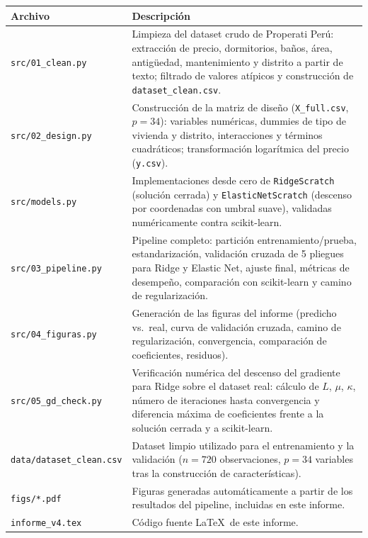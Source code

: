 \documentclass[11pt,a4paper]{article}
\theoremstyle{simple}
\begin{document}
\begin{center}
\renewcommand{\arraystretch}{1.2}
\begin{tabular}{L{5.2cm}L{8.3cm}}
\toprule
\textbf{Archivo} & \textbf{Descripci\'on} \\
\midrule
\texttt{src/01\_clean.py} & Limpieza del dataset crudo de Properati Per\'u: extracci\'on de precio, dormitorios, ba\~nos, \'area, antig\"uedad, mantenimiento y distrito a partir de texto; filtrado de valores at\'ipicos y construcci\'on de \texttt{dataset\_clean.csv}. \\
\texttt{src/02\_design.py} & Construcci\'on de la matriz de dise\~no (\texttt{X\_full.csv}, $p=34$): variables num\'ericas, dummies de tipo de vivienda y distrito, interacciones y t\'erminos cuadr\'aticos; transformaci\'on logar\'itmica del precio (\texttt{y.csv}). \\
\texttt{src/models.py} & Implementaciones desde cero de \texttt{RidgeScratch} (soluci\'on cerrada) y \texttt{ElasticNetScratch} (descenso por coordenadas con umbral suave), validadas num\'ericamente contra scikit-learn. \\
\texttt{src/03\_pipeline.py} & Pipeline completo: partici\'on entrenamiento/prueba, estandarizaci\'on, validaci\'on cruzada de 5 pliegues para Ridge y Elastic Net, ajuste final, m\'etricas de desempe\~no, comparaci\'on con scikit-learn y camino de regularizaci\'on. \\
\texttt{src/04\_figuras.py} & Generaci\'on de las figuras del informe (predicho vs.\ real, curva de validaci\'on cruzada, camino de regularizaci\'on, convergencia, comparaci\'on de coeficientes, residuos). \\
\texttt{src/05\_gd\_check.py} & Verificaci\'on num\'erica del descenso del gradiente para Ridge sobre el dataset real: c\'alculo de $L$, $\mu$, $\kappa$, n\'umero de iteraciones hasta convergencia y diferencia m\'axima de coeficientes frente a la soluci\'on cerrada y a scikit-learn. \\
\texttt{data/dataset\_clean.csv} & Dataset limpio utilizado para el entrenamiento y la validaci\'on ($n=720$ observaciones, $p=34$ variables tras la construcci\'on de caracter\'isticas). \\
\texttt{figs/*.pdf} & Figuras generadas autom\'aticamente a partir de los resultados del pipeline, incluidas en este informe. \\
\texttt{informe\_v4.tex} & C\'odigo fuente \LaTeX\ de este informe. \\
\bottomrule
\end{tabular}
\end{center}
\end{document}
